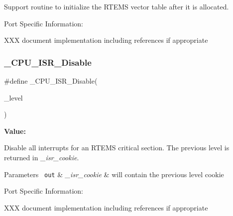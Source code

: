Support routine to initialize the R\+T\+E\+MS vector table after it is allocated.

Port Specific Information\+:

X\+XX document implementation including references if appropriate \mbox{\label{group__RTEMSScoreCPUBfinCPUInterrupt_gabc05c31eff429870b8564553d9eae054}} 
\subsubsection{\texorpdfstring{\_CPU\_ISR\_Disable}{\_CPU\_ISR\_Disable}}
{\footnotesize\ttfamily \#define \+\_\+\+C\+P\+U\+\_\+\+I\+S\+R\+\_\+\+Disable(\begin{DoxyParamCaption}\item[{}]{\+\_\+level }\end{DoxyParamCaption})}

{\bfseries Value\+:}
\begin{DoxyCode}{0}
\DoxyCodeLine{\{                                     \(\backslash\)}
\DoxyCodeLine{  \}}

\end{DoxyCode}
Disable all interrupts for an R\+T\+E\+MS critical section. The previous level is returned in {\itshape \+\_\+isr\+\_\+cookie}.


\begin{DoxyParams}[1]{Parameters}
\mbox{\texttt{ out}}  & {\em \+\_\+isr\+\_\+cookie} & will contain the previous level cookie\\
\hline
\end{DoxyParams}
Port Specific Information\+:

X\+XX document implementation including references if appropriate \mbox{\label{group__RTEMSScoreCPUBfinCPUInterrupt_ga01f5da058924ecbc4c84ceb8613145a0}} 
